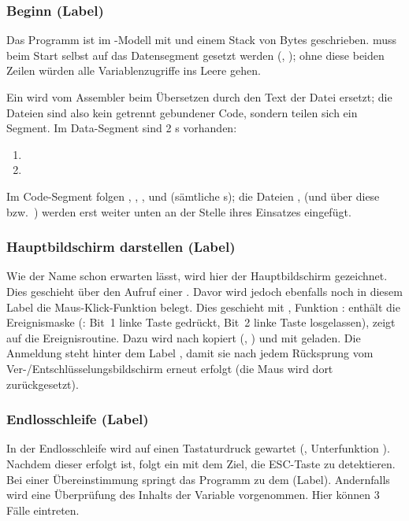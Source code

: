 \subsubsection{Beginn (Label)}
Das Programm ist im -Modell mit  und einem Stack von  Bytes geschrieben.  muss beim Start selbst auf das Datensegment gesetzt werden (, ); ohne diese beiden Zeilen würden alle Variablenzugriffe ins Leere gehen.

Ein  wird vom Assembler beim Übersetzen durch den Text der Datei ersetzt; die Dateien sind also kein getrennt gebundener Code, sondern teilen sich ein Segment. Im Data-Segment sind 2 s vorhanden:
\begin{enumerate}[label=\arabic*,noitemsep]
    \item {}
    \item {}
\end{enumerate}
Im Code-Segment folgen , , ,  und  (sämtliche s); die Dateien ,  (und über diese  bzw.\ ) werden erst weiter unten an der Stelle ihres Einsatzes eingefügt.

\subsubsection{Hauptbildschirm darstellen (Label)}
Wie der Name schon erwarten lässt, wird hier der Hauptbildschirm gezeichnet. Dies geschieht über den Aufruf einer  . Davor wird jedoch ebenfalls noch in diesem Label die Maus-Klick-Funktion belegt. Dies geschieht mit , Funktion :  enthält die Ereignismaske (: Bit~1 linke Taste gedrückt, Bit~2 linke Taste losgelassen),  zeigt auf die Ereignisroutine. Dazu wird  nach  kopiert (, ) und  mit  geladen. Die Anmeldung steht hinter dem Label , damit sie nach jedem Rücksprung vom Ver-/Entschlüsselungsbildschirm erneut erfolgt (die Maus wird dort zurückgesetzt).

\subsubsection{Endlosschleife (Label)}
In der Endlosschleife wird auf einen Tastaturdruck gewartet (, Unterfunktion ). Nachdem dieser erfolgt ist, folgt ein  mit dem Ziel, die ESC-Taste zu detektieren. Bei einer Übereinstimmung springt das Programm zu dem  (Label). Andernfalls wird eine Überprüfung des Inhalts der Variable  vorgenommen. Hier können 3 Fälle eintreten.

